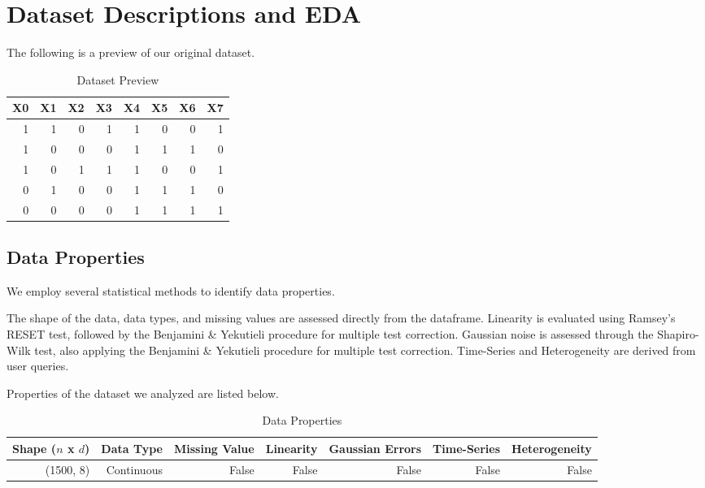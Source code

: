 \documentclass{article}
\begin{document}
\section{Dataset Descriptions and EDA}
The following is a preview of our original dataset.

\begin{table}[H]
    \centering
    \caption{Dataset Preview}
    \begin{tabular}{rrrrrrrr}
\toprule
 X0 &  X1 &  X2 &  X3 &  X4 &  X5 &  X6 &  X7 \\
\midrule
  1 &   1 &   0 &   1 &   1 &   0 &   0 &   1 \\
  1 &   0 &   0 &   0 &   1 &   1 &   1 &   0 \\
  1 &   0 &   1 &   1 &   1 &   0 &   0 &   1 \\
  0 &   1 &   0 &   0 &   1 &   1 &   1 &   0 \\
  0 &   0 &   0 &   0 &   1 &   1 &   1 &   1 \\
\bottomrule
\end{tabular}

\end{table}

\subsection{Data Properties}
We employ several statistical methods to identify data properties.

The shape of the data, data types, and missing values are assessed directly from the dataframe.
Linearity is evaluated using Ramsey’s RESET test, followed by the Benjamini \& Yekutieli procedure for multiple test correction.
Gaussian noise is assessed through the Shapiro-Wilk test, also applying the Benjamini \& Yekutieli procedure for multiple test correction.
Time-Series and Heterogeneity are derived from user queries.

Properties of the dataset we analyzed are listed below.

\begin{table}[H]
    \centering
    \caption{Data Properties}

        \begin{tabular}{rrrrrrr}
            \toprule
            Shape ($n$ x $d$) & Data Type & Missing Value & Linearity & Gaussian Errors & Time-Series & Heterogeneity \\
            \midrule
            (1500, 8)   & Continuous & False & False & False & False & False \\
            \bottomrule
        \end{tabular}
        
\end{table}
\end{document}
